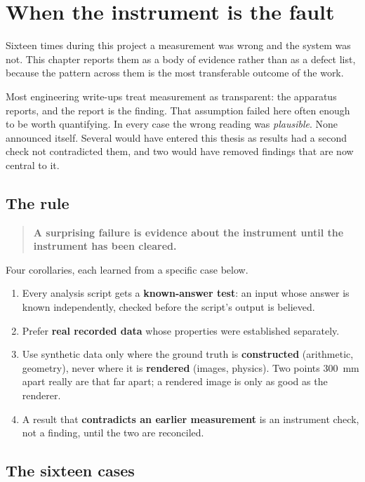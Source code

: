 \chapter{When the instrument is the fault}
\label{ch:instrument}

Sixteen times during this project a measurement was wrong and the system was
not. This chapter reports them as a body of evidence rather than as a defect
list, because the pattern across them is the most transferable outcome of the
work.

Most engineering write-ups treat measurement as transparent: the apparatus
reports, and the report is the finding. That assumption failed here often
enough to be worth quantifying. In every case the wrong reading was
\emph{plausible}. None announced itself. Several would have entered this
thesis as results had a second check not contradicted them, and two would have
removed findings that are now central to it.

\section{The rule}

\begin{quote}
\textbf{A surprising failure is evidence about the instrument until the
instrument has been cleared.}
\end{quote}

Four corollaries, each learned from a specific case below.

\begin{enumerate}
  \item Every analysis script gets a \textbf{known-answer test}: an input whose
    answer is known independently, checked before the script's output is
    believed.
  \item Prefer \textbf{real recorded data} whose properties were established
    separately.
  \item Use synthetic data only where the ground truth is \textbf{constructed}
    (arithmetic, geometry), never where it is \textbf{rendered} (images,
    physics). Two points \SI{300}{\milli\metre} apart really are that far
    apart; a rendered image is only as good as the renderer.
  \item A result that \textbf{contradicts an earlier measurement} is an
    instrument check, not a finding, until the two are reconciled.
\end{enumerate}

\section{The sixteen cases}

